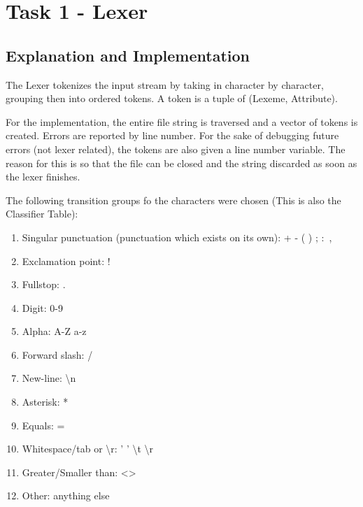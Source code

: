 \section{Task 1 - Lexer}
\subsection{Explanation and Implementation}
The Lexer tokenizes the input stream by taking in character by character, grouping then into ordered tokens. A token is a tuple of (Lexeme, Attribute).

For the implementation, the entire file string is traversed and a vector of tokens is created. Errors are reported by line number. For the sake of debugging future errors (not lexer related), the tokens are also given a line number variable. The reason for this is so that the file can be closed and the string discarded as soon as the lexer finishes.

The following transition groups fo the characters were chosen (This is also the Classifier Table):
\begin{enumerate}
	\item Singular punctuation (punctuation which exists on its own): + - ( ) \textbraceleft \textbraceright ; $\colon$ ,
	\item Exclamation point: !
	\item Fullstop: .
	\item Digit: 0-9
	\item Alpha: A-Z a-z \textunderscore
	\item Forward slash: /
	\item New-line: \textbackslash n
	\item Asterisk: *
	\item Equals: =
	\item Whitespace/tab or \textbackslash r: ' ' \textbackslash t \textbackslash r
	\item Greater/Smaller than: \textless  \textgreater
	\item Other: anything else
\end{enumerate}

